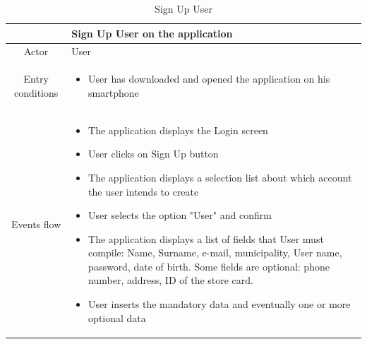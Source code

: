 \documentclass[table, 12pt]{article}
\begin{document}
\begin{longtable}{ | c | p{10cm} | }
    \caption{Sign Up User}                                                                                                                                                                                                                                                                    \\

    \hline
                     & Sign Up User on the application                                                                                                                                                                                                                                        \\
    \hline
    Actor            & User                                                                                                                                                                                                                                                                   \\
    \hline
    Entry conditions &
    \begin{itemize}
        \item User has downloaded and opened the application on his smartphone
    \end{itemize}                                                                                                                                                                                                                                                                \\
    \hline
    Events flow      & \begin{itemize}[nosep,after=\strut]
        \item The application displays the Login screen
        \item User clicks on Sign Up button
        \item The application displays a selection list about which account the user intends to create
        \item User selects the option "User" and confirm
        \item The application displays a list of fields that User must compile: Name, Surname, e-mail, municipality, User name, password, date of birth. Some fields are optional: phone number, address, ID of the store card.
        \item User inserts the mandatory data and eventually one or more optional data

\end{itemize}
\end{longtable}
\end{document}
